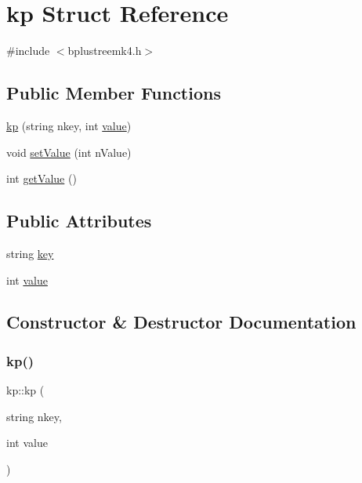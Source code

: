 \hypertarget{structkp}{}\section{kp Struct Reference}
\label{structkp}


{\ttfamily \#include $<$bplustreemk4.\+h$>$}

\subsection*{Public Member Functions}
\begin{DoxyCompactItemize}
\item 
\mbox{\hyperlink{structkp_a75af09c8014356feb5d46bd2d44e4324}{kp}} (string nkey, int \mbox{\hyperlink{structkp_a743afbf5f8333e19be5ade0ed1a0caa4}{value}})
\item 
void \mbox{\hyperlink{structkp_a58583317a8847b368728e8822b01e516}{set\+Value}} (int n\+Value)
\item 
int \mbox{\hyperlink{structkp_a366eb1c99529bddfd7a03d164445fbe5}{get\+Value}} ()
\end{DoxyCompactItemize}
\subsection*{Public Attributes}
\begin{DoxyCompactItemize}
\item 
string \mbox{\hyperlink{structkp_ab46106230758af92770fa00fd317e273}{key}}
\item 
int \mbox{\hyperlink{structkp_a743afbf5f8333e19be5ade0ed1a0caa4}{value}}
\end{DoxyCompactItemize}


\subsection{Constructor \& Destructor Documentation}
\mbox{\label{structkp_a75af09c8014356feb5d46bd2d44e4324}} 
\subsubsection{\texorpdfstring{kp()}{kp()}}
{\footnotesize\ttfamily kp\+::kp (\begin{DoxyParamCaption}\item[{string}]{nkey,  }\item[{int}]{value }\end{DoxyParamCaption})\hspace{0.3cm}{\ttfamily [inline]}}


